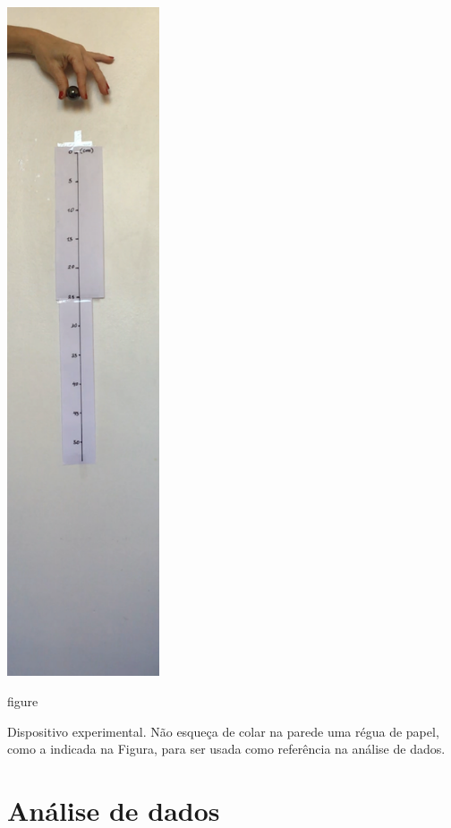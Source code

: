 \begin{minipage}[c]{7cm}
\hskip 1cm
\includegraphics[width=4.5cm]{Figuras_exp3/fig1.pdf}
\caption{figure}{\label{fig:experimento} Dispositivo experimental. Não esqueça de colar na parede uma régua de papel, como a indicada na Figura, para ser usada como referência na análise de dados.}
\end{minipage}
\clearpage
\section{Análise de dados}
\indent 


